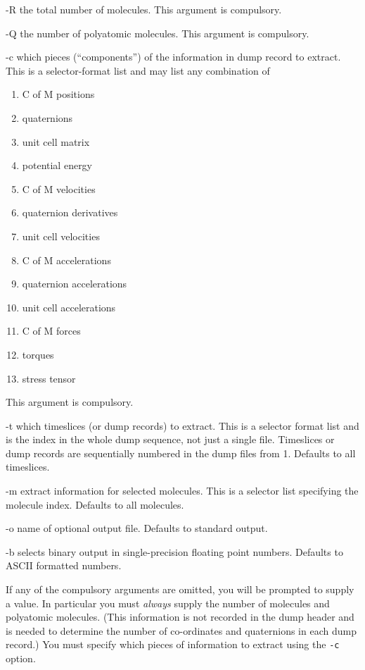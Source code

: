 \begin{list}{}{\let\makelabel\boldlabel\itemsep=0pt\parsep=3pt\leftmargin=1.5cm}
\item[-R] the total number of molecules.  This argument is compulsory.
\item[-Q] the number of polyatomic molecules.  This argument is compulsory.
\item[-c] which pieces (``components'') of the information in dump
record to extract.  This is a selector-format list and may list any
combination of
\begin{enumerate}
\itemsep=0pt
\parskip=0pt
\item C of M positions
\item quaternions
\item unit cell matrix
\item potential energy
\item C of M velocities
\item quaternion derivatives
\item unit cell velocities
\item C of M accelerations
\item quaternion accelerations
\item unit cell accelerations
\item C of M forces
\item torques
\item stress tensor
\end{enumerate}
This argument is compulsory.
\item[-t] which timeslices (or dump records) to extract.  This is a
selector format list and is the index in the whole dump sequence, not
just a single file.  Timeslices or dump records are sequentially
numbered in the dump files from 1.  Defaults to all timeslices.
\item[-m] extract information for selected molecules.  This is a
selector list specifying the molecule index.  Defaults to all
molecules.
\item[-o] name of optional output file.  Defaults to standard output.
\item[-b] selects binary output in single-precision floating point
numbers. Defaults to ASCII formatted numbers.
\end{list}
If any of the compulsory arguments are omitted, you will be prompted
to supply a value.  In particular you must {\em always\/} supply the
number of molecules and polyatomic molecules.  (This information is
not recorded in the dump header and is needed to determine the number
of co-ordinates and quaternions in each dump record.)  You must
specify which pieces of information to extract using the \verb'-c'
option.

